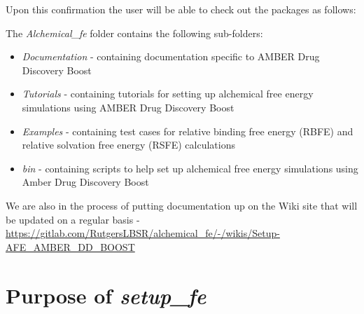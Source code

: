 \documentclass[11pt,letterpaper,titlepage]{article}
\begin{document}
Upon this confirmation the user will be able to check out the packages as follows: \\



The \textit{Alchemical\_fe} folder contains the following sub-folders:
\begin{itemize}
        \item{\textit{Documentation} - containing documentation specific to AMBER Drug Discovery Boost}
        \item{\textit{Tutorials} - containing tutorials for setting up alchemical free energy simulations using AMBER Drug Discovery Boost}
        \item{\textit{Examples} - containing test cases for relative binding free energy (RBFE) and relative solvation free energy (RSFE) calculations}
        \item{\textit{bin} - containing scripts to help set up alchemical free energy simulations using Amber Drug Discovery Boost}
\end{itemize}


We are also in the process of putting documentation up on the Wiki site that will be updated on a regular basis - \url{https://gitlab.com/RutgersLBSR/alchemical\_fe/-/wikis/Setup-AFE\_AMBER\_DD\_BOOST}


\vspace{1cm}
\section{Purpose of \textit{setup\_fe}}
\vspace{1cm}
\end{document}
